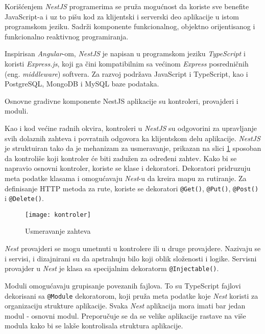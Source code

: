 Korišćenjem \textit{NestJS} programerima se pruža mogućnost da koriste sve benefite JavaScript-a i uz
to pišu kod za klijentski i serverski deo aplikacije u istom programskom jeziku. Sadrži komponente 
funkcionalnog, objektno orijentisanog i funkcionalno reaktivnog programiranja.

Inspirisan \textit{Angular}-om, \textit{NestJS} je napisan u programskom jeziku \textit{TypeScript} 
i koristi \textit{Express.js}, koji ga čini kompatibilnim sa većinom \textit{Express} posredničnih 
(eng. \textit{middleware}) softvera. Za razvoj podržava JavaScript i TypeScript, kao i PostgreSQL, 
MongoDB i MySQL baze podataka.

Osnovne gradivne komponente NestJS aplikacije su kontroleri, provajderi i moduli.

Kao i kod većine radnih okvira, kontroleri u \textit{NestJS} su odgovorini za upravljanje %
svih dolaznih zahteva i povratnih odgovora ka klijentskom delu aplikacije. \textit{NestJS} je struktuiran tako da je 
mehanizam za usmeravanje, prikazan na slici \ref{fig:kontroler} sposoban da kontroliše koji kontroler 
će biti zadužen za određeni zahtev.
Kako bi se napravio osnovni kontroler, koriste se klase i dekoratori. Dekoratori pridruzuju meta 
podatke klasama i omogućavaju \textit{Nest}-u da kreira mapu za rutiranje. Za definisanje HTTP 
metoda za rute, koriste se dekoratori \texttt{@Get()}, \texttt{@Put()}, \texttt{@Post()} i \texttt{@Delete()}.~\cite{nest}

\begin{figure}[h]
    \centering
    \texttt{[image: kontroler]}
    \caption{Usmeravanje zahteva}
    \label{fig:kontroler}
\end{figure}
  
\textit{Nest} provajderi se mogu umetnuti u kontrolere ili u druge provajdere. Nazivaju se i servisi, 
i dizajnirani su da apstrahuju bilo koji oblik složenosti i logike.
Servisni provajder u \textit{Nest} je klasa sa specijalnim dekoratorm \texttt{@Injectable()}. 

Moduli omogućavaju grupisanje povezanih fajlova. To su TypeScript fajlovi dekorisani sa 
\texttt{@Module} dekoratorom, koji pruža meta podatke koje \textit{Nest} koristi za organizaciju 
strukture aplikacije. Svaka \textit{Nest} aplikacija mora imati bar jedan modul - osnovni modul. 
Preporučuje se da se velike aplikacije rastave na više modula kako bi se lakše kontrolisala 
struktura aplikacije.

